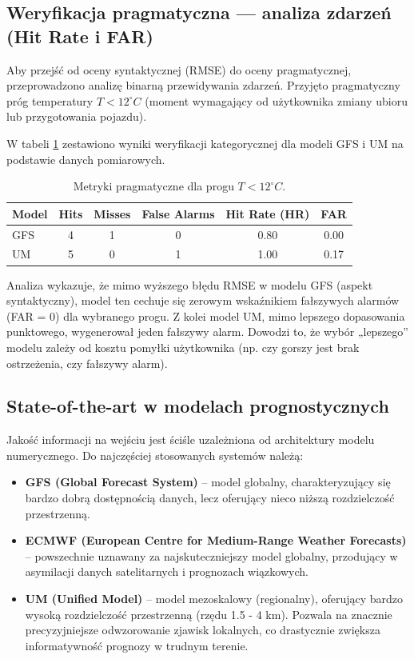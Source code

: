 \documentclass[a4paper,12pt]{article}
\begin{document}
\newpage
\subsection{Weryfikacja pragmatyczna — analiza zdarzeń (Hit Rate i FAR)}

Aby przejść od oceny syntaktycznej (RMSE) do oceny pragmatycznej, przeprowadzono analizę binarną przewidywania zdarzeń. Przyjęto pragmatyczny próg temperatury $T < 12^\circ C$ (moment wymagający od użytkownika zmiany ubioru lub przygotowania pojazdu). 

W tabeli \ref{tab:metrics} zestawiono wyniki weryfikacji kategorycznej dla modeli GFS i UM na podstawie danych pomiarowych.

\begin{table}[h]
    \centering
    \begin{tabular}{lccccc}
    \toprule
    Model & Hits & Misses & False Alarms & Hit Rate (HR) & FAR \\
    \midrule
    GFS & 4 & 1 & 0 & 0.80 & 0.00 \\
    UM  & 5 & 0 & 1 & 1.00 & 0.17 \\
    \bottomrule
    \end{tabular}
    \caption{Metryki pragmatyczne dla progu $T < 12^\circ C$.}
    \label{tab:metrics}
\end{table}

Analiza wykazuje, że mimo wyższego błędu RMSE w modelu GFS (aspekt syntaktyczny), model ten cechuje się zerowym wskaźnikiem fałszywych alarmów (FAR = 0) dla wybranego progu. Z kolei model UM, mimo lepszego dopasowania punktowego, wygenerował jeden fałszywy alarm. Dowodzi to, że wybór „lepszego” modelu zależy od kosztu pomyłki użytkownika (np. czy gorszy jest brak ostrzeżenia, czy fałszywy alarm).
\subsection{State-of-the-art w modelach prognostycznych}

Jakość informacji na wejściu jest ściśle uzależniona od architektury modelu numerycznego. Do najczęściej stosowanych systemów należą:
\begin{itemize}
    \item \textbf{GFS (Global Forecast System)} -- model globalny, charakteryzujący się bardzo dobrą dostępnością danych, lecz oferujący nieco niższą rozdzielczość przestrzenną.
    \item \textbf{ECMWF (European Centre for Medium-Range Weather Forecasts)} -- powszechnie uznawany za najskuteczniejszy model globalny, przodujący w asymilacji danych satelitarnych i prognozach wiązkowych.
    \item \textbf{UM (Unified Model)} -- model mezoskalowy (regionalny), oferujący bardzo wysoką rozdzielczość przestrzenną (rzędu 1.5 - 4 km). Pozwala na znacznie precyzyjniejsze odwzorowanie zjawisk lokalnych, co drastycznie zwiększa informatywność prognozy w trudnym terenie.
\end{itemize}
\end{document}
